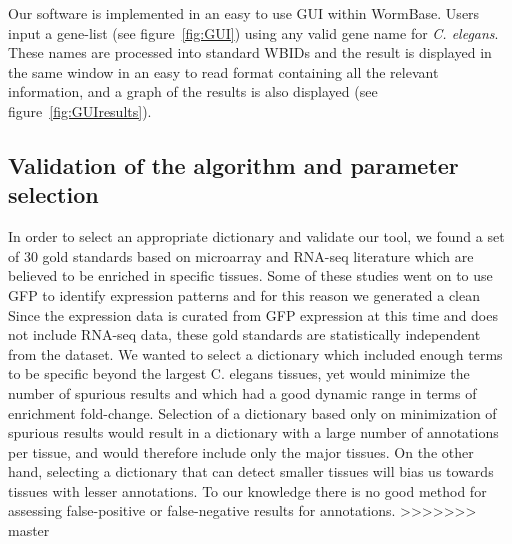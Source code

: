 \documentclass[linenumbers, doublespacing]{bmcart}
\begin{document}
	Our software is implemented in an easy to use GUI within WormBase. Users input a gene-list (see figure~\ref{fig:GUI}) using any valid gene name for \emph{C. elegans}. These names are processed into standard WBIDs and the result is displayed in the same window in an easy to read format containing all the relevant information, and a graph of the results is also displayed (see figure~\ref{fig:GUIresults}).
	
\subsection*{Validation of the algorithm and parameter selection}
	In order to select an appropriate dictionary and validate our tool, we found a set of 30 gold standards based on microarray and RNA-seq literature which are believed to be enriched in specific tissues\cite{Gaudet2004a, Spencer2011, Cinar2005, Watson2008a, Pauli2006, Portman2004, Fox2007, Smith2010}. Some of these studies went on to use GFP to identify expression patterns and for this reason we generated a clean Since the expression data is curated from GFP expression at this time and does not include RNA-seq data, these gold standards are statistically independent from the dataset. We wanted to select a dictionary which included enough terms to be specific beyond the largest C. elegans tissues, yet would minimize the number of spurious results and which had a good dynamic range in terms of enrichment fold-change. Selection of a dictionary based only on minimization of spurious results would result in a dictionary with a large number of annotations per tissue, and would therefore include only the major tissues. On the other hand, selecting a dictionary that can detect smaller tissues will bias us towards tissues with lesser annotations. To our knowledge there is no good method for assessing false-positive or false-negative results for annotations. 
>>>>>>> master
	
\end{document}
